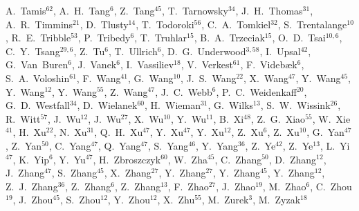 {A.~Tamis$^{62}$,
A.~H.~Tang$^{6}$,
Z.~Tang$^{45}$,
T.~Tarnowsky$^{34}$,
J.~H.~Thomas$^{31}$,
A.~R.~Timmins$^{21}$,
D.~Tlusty$^{14}$,
T.~Todoroki$^{56}$,
C.~A.~Tomkiel$^{32}$,
S.~Trentalange$^{10}$,
R.~E.~Tribble$^{53}$,
P.~Tribedy$^{6}$,
T.~Truhlar$^{15}$,
B.~A.~Trzeciak$^{15}$,
O.~D.~Tsai$^{10,6}$,
C.~Y.~Tsang$^{29,6}$,
Z.~Tu$^{6}$,
T.~Ullrich$^{6}$,
D.~G.~Underwood$^{3,58}$,
I.~Upsal$^{42}$,
G.~Van~Buren$^{6}$,
J.~Vanek$^{6}$,
I.~Vassiliev$^{18}$,
V.~Verkest$^{61}$,
F.~Videb{\ae}k$^{6}$,
S.~A.~Voloshin$^{61}$,
F.~Wang$^{41}$,
G.~Wang$^{10}$,
J.~S.~Wang$^{22}$,
X.~Wang$^{47}$,
Y.~Wang$^{45}$,
Y.~Wang$^{12}$,
Y.~Wang$^{55}$,
Z.~Wang$^{47}$,
J.~C.~Webb$^{6}$,
P.~C.~Weidenkaff$^{20}$,
G.~D.~Westfall$^{34}$,
D.~Wielanek$^{60}$,
H.~Wieman$^{31}$,
G.~Wilks$^{13}$,
S.~W.~Wissink$^{26}$,
R.~Witt$^{57}$,
J.~Wu$^{12}$,
J.~Wu$^{27}$,
X.~Wu$^{10}$,
Y.~Wu$^{11}$,
B.~Xi$^{48}$,
Z.~G.~Xiao$^{55}$,
W.~Xie$^{41}$,
H.~Xu$^{22}$,
N.~Xu$^{31}$,
Q.~H.~Xu$^{47}$,
Y.~Xu$^{47}$,
Y.~Xu$^{12}$,
Z.~Xu$^{6}$,
Z.~Xu$^{10}$,
G.~Yan$^{47}$,
Z.~Yan$^{50}$,
C.~Yang$^{47}$,
Q.~Yang$^{47}$,
S.~Yang$^{46}$,
Y.~Yang$^{36}$,
Z.~Ye$^{42}$,
Z.~Ye$^{13}$,
L.~Yi$^{47}$,
K.~Yip$^{6}$,
Y.~Yu$^{47}$,
H.~Zbroszczyk$^{60}$,
W.~Zha$^{45}$,
C.~Zhang$^{50}$,
D.~Zhang$^{12}$,
J.~Zhang$^{47}$,
S.~Zhang$^{45}$,
X.~Zhang$^{27}$,
Y.~Zhang$^{27}$,
Y.~Zhang$^{45}$,
Y.~Zhang$^{12}$,
Z.~J.~Zhang$^{36}$,
Z.~Zhang$^{6}$,
Z.~Zhang$^{13}$,
F.~Zhao$^{27}$,
J.~Zhao$^{19}$,
M.~Zhao$^{6}$,
C.~Zhou$^{19}$,
J.~Zhou$^{45}$,
S.~Zhou$^{12}$,
Y.~Zhou$^{12}$,
X.~Zhu$^{55}$,
M.~Zurek$^{3}$,
M.~Zyzak$^{18}$
}

\address{\rm{(STAR Collaboration)}}

